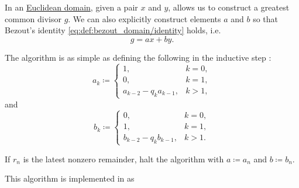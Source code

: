 \begin{algorithm}\label{alg:extended_euclidean_algorithm}
  In an \hyperref[def:euclidean_domain]{Euclidean domain}, given a pair \( x \) and \( y \),  allows us to construct a greatest common divisor \( g \). We can also explicitly construct elements \( a \) and \( b \) so that Bezout's identity \eqref{eq:def:bezout_domain/identity} holds, i.e.
  \begin{equation*}
    g = ax + by.
  \end{equation*}

  The algorithm is as simple as defining the following in the inductive step :
  \begin{equation*}
    a_k \coloneqq \begin{cases}
      1,                     &k = 0, \\
      0,                     &k = 1, \\
      a_{k-2} - q_k a_{k-1}, &k > 1,
    \end{cases}
  \end{equation*}
  and
  \begin{equation*}
    b_k \coloneqq \begin{cases}
      0,                     &k = 0, \\
      1,                     &k = 1, \\
      b_{k-2} - q_k b_{k-1}, &k > 1.
    \end{cases}
  \end{equation*}

  If \( r_n \) is the latest nonzero remainder, halt the algorithm with \( a \coloneqq a_n \) and \( b \coloneqq b_n \).
\end{algorithm}
\begin{comments}
  \item This algorithm is implemented in \cite{notebook:code} as
  \begin{CodeRefDisplay}
  \end{CodeRefDisplay}
\end{comments}
